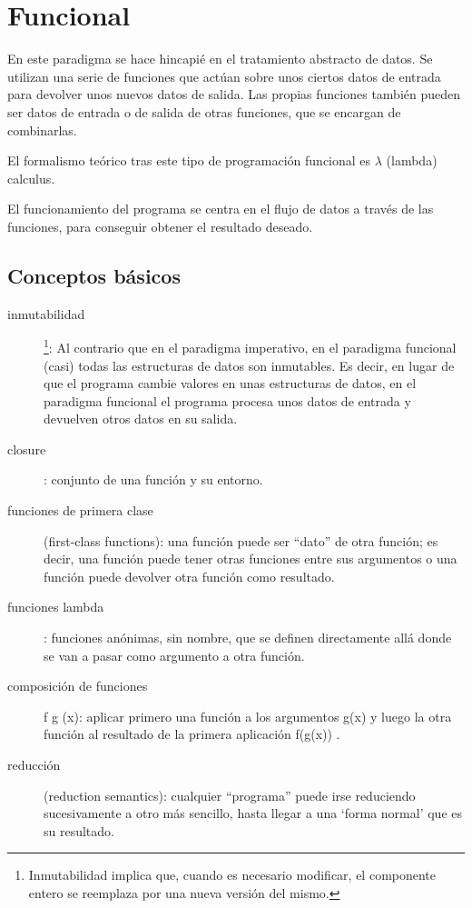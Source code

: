 \documentclass[spanish,12pt,a4paper,final,oneside]{book}
\begin{document}
\section{Funcional}
En este paradigma se hace hincapié en el tratamiento abstracto de datos. Se utilizan una serie de funciones que actúan sobre unos ciertos datos de entrada para devolver unos nuevos datos de salida. Las  propias funciones también pueden ser datos de entrada o de salida de otras funciones, que se encargan de combinarlas.

El formalismo teórico tras este tipo de programación funcional es $\lambda$ (lambda) calculus.

El funcionamiento del programa se centra en el flujo de datos a través de las funciones, para conseguir obtener el resultado deseado.

\subsection*{Conceptos básicos}

\begin{description}

\item[inmutabilidad]\footnote{Inmutabilidad implica que, cuando es necesario modificar, el componente entero se reemplaza por una nueva versión del mismo.}: Al contrario que en el paradigma imperativo, en el paradigma funcional (casi) todas las estructuras de datos son inmutables. Es decir, en lugar de que el programa cambie valores en unas estructuras de datos, en el paradigma funcional el programa procesa unos datos de entrada y devuelven otros datos en su salida.

\item[closure]: conjunto de una función y su entorno.

\item[funciones de primera clase] (first-class functions): una función puede ser ``dato'' de otra función; es decir, una función puede tener otras funciones entre sus argumentos o una función puede devolver otra función como resultado. 

\item[funciones lambda]: funciones anónimas, sin nombre, que se definen directamente allá donde se van a pasar como argumento a otra función.

\item[composición de funciones] f g (x): aplicar primero una función a los argumentos g(x) y luego la otra función al resultado de la primera aplicación f(g(x)) .

\item[reducción] (reduction semantics): cualquier ``programa'' puede irse reduciendo sucesivamente a otro más sencillo, hasta llegar a una `forma normal' que es su resultado. 

\end{description}
\end{document}
